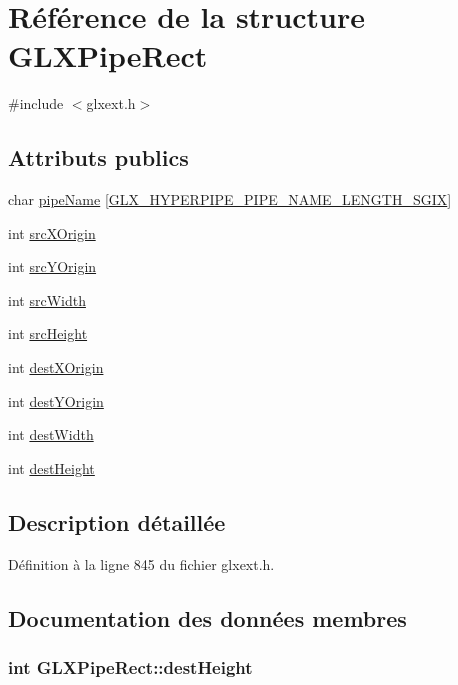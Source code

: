 \hypertarget{struct_g_l_x_pipe_rect}{\section{Référence de la structure G\-L\-X\-Pipe\-Rect}
\label{struct_g_l_x_pipe_rect}
}


{\ttfamily \#include $<$glxext.\-h$>$}

\subsection*{Attributs publics}
\begin{DoxyCompactItemize}
\item 
char \hyperlink{struct_g_l_x_pipe_rect_aa4c4f60e9647705ddefa10f95a37cb79}{pipe\-Name} \mbox{[}\hyperlink{glxext_8h_ae1c8261c0861010d8003a31d07e26005}{G\-L\-X\-\_\-\-H\-Y\-P\-E\-R\-P\-I\-P\-E\-\_\-\-P\-I\-P\-E\-\_\-\-N\-A\-M\-E\-\_\-\-L\-E\-N\-G\-T\-H\-\_\-\-S\-G\-I\-X}\mbox{]}
\item 
int \hyperlink{struct_g_l_x_pipe_rect_a9df2313c01f75d149e64f2ff467bc266}{src\-X\-Origin}
\item 
int \hyperlink{struct_g_l_x_pipe_rect_a1f7316dff7050ab2ce9d3d37f8c5450e}{src\-Y\-Origin}
\item 
int \hyperlink{struct_g_l_x_pipe_rect_a2c6c180a4dabb71076366e06a1c7d0ef}{src\-Width}
\item 
int \hyperlink{struct_g_l_x_pipe_rect_a35632524bce6bffa05f284a9b1c1b8ff}{src\-Height}
\item 
int \hyperlink{struct_g_l_x_pipe_rect_a8b7b941894ad3420326d7e9fa885bb71}{dest\-X\-Origin}
\item 
int \hyperlink{struct_g_l_x_pipe_rect_aef7766b02ef07c20a11e89da5878b469}{dest\-Y\-Origin}
\item 
int \hyperlink{struct_g_l_x_pipe_rect_a3c07991d2a8fb6e973eae834650b3dad}{dest\-Width}
\item 
int \hyperlink{struct_g_l_x_pipe_rect_a858b0ea6642e451495aff35cfefbd083}{dest\-Height}
\end{DoxyCompactItemize}


\subsection{Description détaillée}


Définition à la ligne 845 du fichier glxext.\-h.



\subsection{Documentation des données membres}
\hypertarget{struct_g_l_x_pipe_rect_a858b0ea6642e451495aff35cfefbd083}{
\subsubsection[{dest\-Height}]{\setlength{\rightskip}{0pt plus 5cm}int G\-L\-X\-Pipe\-Rect\-::dest\-Height}}\label{struct_g_l_x_pipe_rect_a858b0ea6642e451495aff35cfefbd083}


